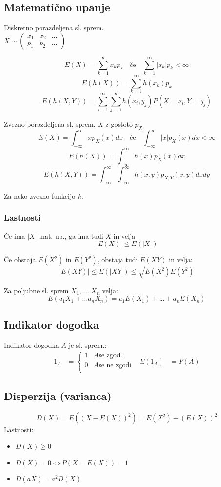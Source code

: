 \begin{multicols}{5}
\subsection{Matematično upanje}
Diskretno porazdeljena sl. sprem. \\
$ X \sim \left( \begin{matrix}
    x_1 & x_2 & \dots \\
    p_1 & p_2 & \dots
\end{matrix}\right) $

\[ E(X) = \sum_{k=1}^\infty x_k p_k \quad \text{če} \quad \sum_{k=1}^\infty |x_k| p_k < \infty \]
\[ E(h(X)) = \sum_{k=1}^\infty h(x_k) p_k \]
\[ E(h(X,Y)) = \sum_{i=1}^\infty \sum_{j=1}^\infty h(x_i, y_j) P(X=x_i, Y=y_j) \]

Zvezno porazdeljena sl. sprem. $X$ z gostoto $p_X$
\[E(X) = \int_{-\infty}^{\infty} x p_X(x) dx \quad \text{če} \quad \int_{-\infty}^{\infty} |x| p_X(x) dx  < \infty\]
\[E(h(X)) = \int_{-\infty}^{\infty} h(x) p_X(x) dx\]
\[E(h(X, Y)) = \int_{-\infty}^\infty \int_{-\infty}^\infty h(x, y) p_{X,Y}(x, y) dx dy\]

Za neko zvezno funkcijo $h$.

\subsubsection{Lastnosti}
Če ima $|X|$ mat. up., ga ima tudi $X$ in velja 
\[|E(X)| \leq E(|X|) \]

Če obstaja $E(X^2)$ in $E(Y^2)$, obstaja tudi $E(XY)$ in velja:
\[|E(XY)| \leq E(|XY|) \leq \sqrt{E(X^2)E(Y^2)} \]

Za poljubne sl. sprem $X_1, \dots, X_n$ velja:
\[ E(a_1 X_1 + \dots a_n X_n) = a_1 E(X_1) + \dots + a_n E(X_n) \]

\subsection{Indikator dogodka}
Indikator dogodka $A$ je sl. sprem.:
\begin{align*}
    1_A &= \begin{cases}
        1 & A \text{se zgodi} \\
        0 & A \text{se ne zgodi} \\
    \end{cases} &
    E(1_A) &= P(A)
\end{align*}

\subsection{Disperzija (varianca)}
\[D(X) = E((X - E(X))^2) = E(X^2) - (E(X))^2\]
Lastnosti: 
\begin{itemize}
    \item $D(X) \geq 0$
    \item $D(X) = 0 \iff P(X = E(X)) = 1$
    \item $D(aX) = a^2 D(X)$
\end{itemize}


\end{multicols}
